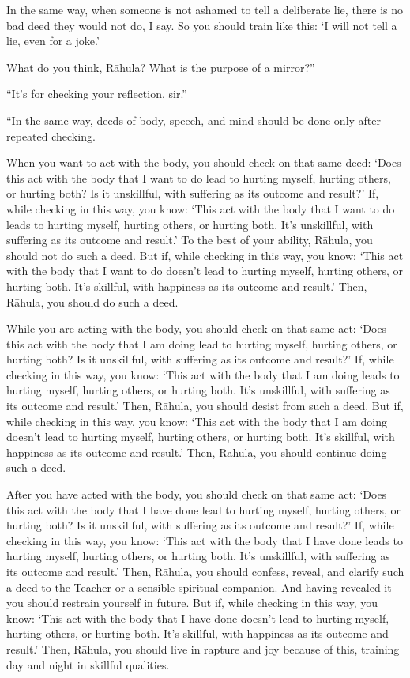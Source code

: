 \documentclass[12pt,openany]{book}%
\begin{document}
In the same way, when someone is not ashamed to tell a deliberate lie, there is no bad deed they would not do, I say. So you should train like this: ‘I will not tell a lie, even for a joke.’ 

What do you think, \textsanskrit{Rāhula}? What is the purpose of a mirror?” 

“It’s for checking your reflection, sir.” 

“In the same way, deeds of body, speech, and mind should be done only after repeated checking. 

When you want to act with the body, you should check on that same deed: ‘Does this act with the body that I want to do lead to hurting myself, hurting others, or hurting both? Is it unskillful, with suffering as its outcome and result?’ If, while checking in this way, you know: ‘This act with the body that I want to do leads to hurting myself, hurting others, or hurting both. It’s unskillful, with suffering as its outcome and result.’ To the best of your ability, \textsanskrit{Rāhula}, you should not do such a deed. But if, while checking in this way, you know: ‘This act with the body that I want to do doesn’t lead to hurting myself, hurting others, or hurting both. It’s skillful, with happiness as its outcome and result.’ Then, \textsanskrit{Rāhula}, you should do such a deed. 

While you are acting with the body, you should check on that same act: ‘Does this act with the body that I am doing lead to hurting myself, hurting others, or hurting both? Is it unskillful, with suffering as its outcome and result?’ If, while checking in this way, you know: ‘This act with the body that I am doing leads to hurting myself, hurting others, or hurting both. It’s unskillful, with suffering as its outcome and result.’ Then, \textsanskrit{Rāhula}, you should desist from such a deed. But if, while checking in this way, you know: ‘This act with the body that I am doing doesn’t lead to hurting myself, hurting others, or hurting both. It’s skillful, with happiness as its outcome and result.’ Then, \textsanskrit{Rāhula}, you should continue doing such a deed. 

After you have acted with the body, you should check on that same act: ‘Does this act with the body that I have done lead to hurting myself, hurting others, or hurting both? Is it unskillful, with suffering as its outcome and result?’ If, while checking in this way, you know: ‘This act with the body that I have done leads to hurting myself, hurting others, or hurting both. It’s unskillful, with suffering as its outcome and result.’ Then, \textsanskrit{Rāhula}, you should confess, reveal, and clarify such a deed to the Teacher or a sensible spiritual companion. And having revealed it you should restrain yourself in future. But if, while checking in this way, you know: ‘This act with the body that I have done doesn’t lead to hurting myself, hurting others, or hurting both. It’s skillful, with happiness as its outcome and result.’ Then, \textsanskrit{Rāhula}, you should live in rapture and joy because of this, training day and night in skillful qualities. 
\end{document}
